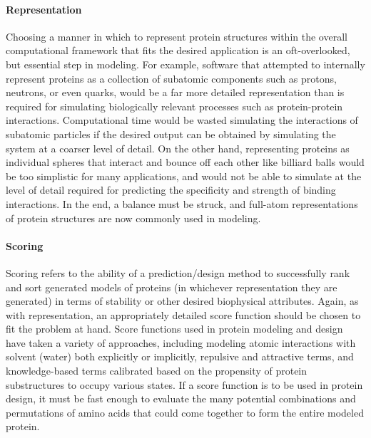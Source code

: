 \paragraph{Representation}
Choosing a manner in which to represent protein structures within the overall computational framework that fits the desired application is an oft-overlooked, but essential step in modeling.
For example, software that attempted to internally represent proteins as a collection of subatomic components such as protons, neutrons, or even quarks, would be a far more detailed representation than is required for simulating biologically relevant processes such as protein-protein interactions.
Computational time would be wasted simulating the interactions of subatomic particles if the desired output can be obtained by simulating the system at a coarser level of detail.
On the other hand, representing proteins as individual spheres that interact and bounce off each other like billiard balls would be too simplistic for many applications, and would not be able to simulate at the level of detail required for predicting the specificity and strength of binding interactions.
In the end, a balance must be struck, and full-atom representations of protein structures are now commonly used in modeling.

\paragraph{Scoring}
Scoring refers to the ability of a prediction/design method to successfully rank and sort generated models of proteins (in whichever representation they are generated) in terms of stability or other desired biophysical attributes.
Again, as with representation, an appropriately detailed score function should be chosen to fit the problem at hand.
Score functions used in protein modeling and design have taken a variety of approaches, including modeling atomic interactions with solvent (water) both explicitly\cite{duan_pointcharge_2003,brooks_charmm:_2009} or implicitly\cite{lazaridis_effective_1999}, repulsive and attractive terms\cite{lennard-jones_determination_1924}, and knowledge-based terms calibrated based on the propensity of protein substructures to occupy various states\cite{rohl_protein_2004}.
If a score function is to be used in protein design, it must be fast enough to evaluate the many potential combinations and permutations of amino acids that could come together to form the entire modeled protein.

